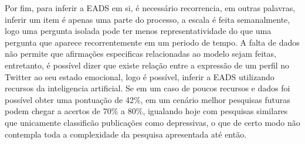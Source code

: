 Por fim, para inferir a EADS em si, é necessário recorrencia, em outras palavras, inferir um item é apenas uma parte do processo, a escala é feita semanalmente, logo uma pergunta isolada pode ter menos representatividade do que uma pergunta que aparece recorrentemente em um periodo de tempo. A falta de dados não permite que afirmações especificas relacionadas ao modelo sejam feitas, entretanto, é possível dizer que existe relação entre a expressão de um perfil no Twitter ao seu estado emocional, logo é possível, inferir a EADS utilizando recursos da inteligencia artificial. Se em um caso de poucos recursos e dados foi possível obter uma pontuação de 42\%, em um cenário melhor pesquisas futuras podem chegar a acertos de 70\% a 80\%, igualando hoje com pesquisas similares que unicamente classificão publicações como depressivas, o que de certo modo não contempla toda a complexidade da pesquisa apresentada até então.